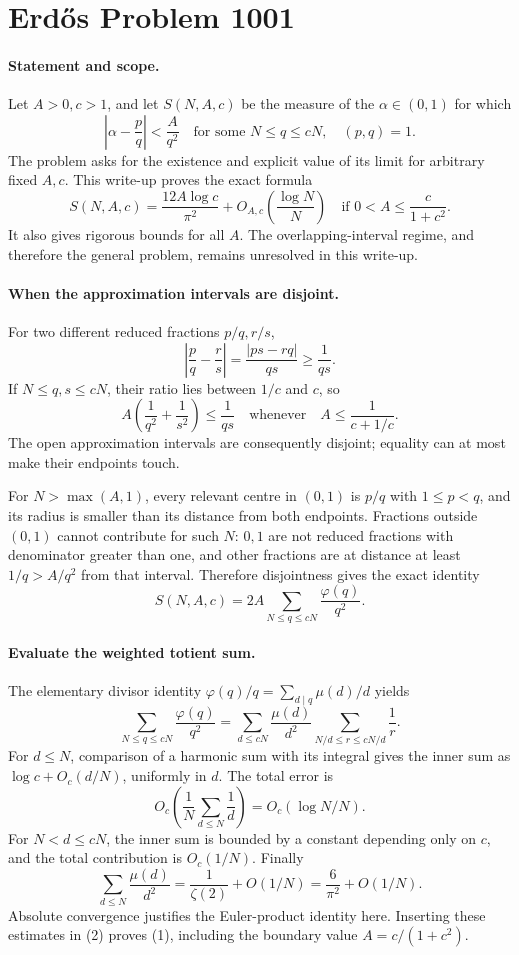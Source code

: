 \section*{Erd\H{o}s Problem 1001}

\paragraph{Statement and scope.}
Let \(A>0,c>1\), and let \(S(N,A,c)\) be the measure of the \(\alpha\in(0,1)\) for which
\[
 \left|\alpha-\frac pq\right|<\frac A{q^2}
 \quad\text{for some }N\leq q\leq cN,\quad (p,q)=1.
\]
The problem asks for the existence and explicit value of its limit for arbitrary fixed \(A,c\). This write-up proves the exact formula
\[
 S(N,A,c)=\frac{12A\log c}{\pi^2}
       +O_{A,c}\!\left(\frac{\log N}{N}\right)
 \quad\text{if }0<A\leq\frac{c}{1+c^2}.
\tag{1}
\]
It also gives rigorous bounds for all \(A\). The overlapping-interval regime, and therefore the general problem, remains unresolved in this write-up.

\paragraph{When the approximation intervals are disjoint.}
For two different reduced fractions \(p/q,r/s\),
\[
 \left|\frac pq-\frac rs\right|
 =\frac{|ps-rq|}{qs}\geq\frac1{qs}.
\]
If \(N\leq q,s\leq cN\), their ratio lies between \(1/c\) and \(c\), so
\[
 A\left(\frac1{q^2}+\frac1{s^2}\right)
 \leq\frac1{qs}
 \quad\text{whenever}\quad A\leq\frac1{c+1/c}.
\]
The open approximation intervals are consequently disjoint; equality can at most make their endpoints touch.

For \(N>\max(A,1)\), every relevant centre in \((0,1)\) is \(p/q\) with \(1\leq p<q\), and its radius is smaller than its distance from both endpoints. Fractions outside \((0,1)\) cannot contribute for such \(N\): \(0,1\) are not reduced fractions with denominator greater than one, and other fractions are at distance at least \(1/q>A/q^2\) from that interval. Therefore disjointness gives the exact identity
\[
 S(N,A,c)=2A\sum_{N\leq q\leq cN}\frac{\varphi(q)}{q^2}.
\tag{2}
\]

\paragraph{Evaluate the weighted totient sum.}
The elementary divisor identity
\(\varphi(q)/q=\sum_{d\mid q}\mu(d)/d\) yields
\[
 \sum_{N\leq q\leq cN}\frac{\varphi(q)}{q^2}
 =\sum_{d\leq cN}\frac{\mu(d)}{d^2}
       \sum_{N/d\leq r\leq cN/d}\frac1r.
\]
For \(d\leq N\), comparison of a harmonic sum with its integral gives the inner sum as
\(\log c+O_c(d/N)\), uniformly in \(d\). The total error is
\[
 O_c\!\left(\frac1N\sum_{d\leq N}\frac1d\right)
 =O_c(\log N/N).
\]
For \(N<d\leq cN\), the inner sum is bounded by a constant depending only on \(c\), and the total contribution is \(O_c(1/N)\). Finally
\[
 \sum_{d\leq N}\frac{\mu(d)}{d^2}
 =\frac1{\zeta(2)}+O(1/N)=\frac6{\pi^2}+O(1/N).
\]
Absolute convergence justifies the Euler-product identity here. Inserting these estimates in (2) proves (1), including the boundary value \(A=c/(1+c^2)\).

